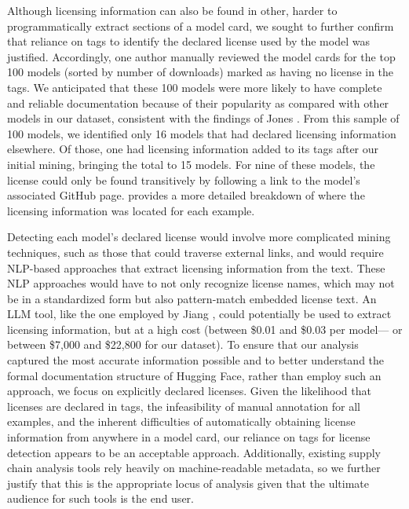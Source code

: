Although licensing information can also be found in other, harder to programmatically extract %
sections of a model card, we sought to further confirm that reliance on tags to identify the declared license used by the model %
was justified. Accordingly, one author manually reviewed the model cards for the top 100 models (sorted by number of downloads) marked as having no license in the tags.  We anticipated that these 100 models were more likely to have complete and reliable documentation because of their popularity as compared with other models in our dataset, consistent with the findings of Jones \etal \cite{Jones2024WhatDW}.  From this sample of 100 models, we identified only 16 models that had declared licensing information elsewhere. Of those, one had licensing information added to its tags after our initial mining, bringing the total to 15 models. For nine of these models, the license could only be found transitively by following a link to the model's associated GitHub page.   provides a more detailed breakdown of where the licensing information was located for each example.%



Detecting each model's declared license %
would involve more complicated mining techniques, such as those that could traverse external links, and would require NLP-based approaches that extract licensing information from the text.  These NLP approaches would have to not only recognize license names, which may not be in a standardized form but also pattern-match embedded license text. An LLM tool, like the one employed by Jiang \etal \cite{jiang2024peatmoss}, could potentially be used to extract licensing information, but at a high cost (between \$0.01 and \$0.03 per model--- or between \$7,000 and \$22,800 for our dataset). To ensure that our analysis captured the most accurate information possible and to better understand the formal documentation structure of Hugging Face, rather than employ such an approach, we focus on explicitly declared licenses.
Given the likelihood that licenses are declared in tags, the infeasibility of manual annotation for all examples, and the inherent difficulties of automatically obtaining license information from anywhere in a model card, our reliance on tags for license detection appears to be an acceptable approach. Additionally, existing supply chain analysis tools rely heavily on machine-readable metadata, so we further justify that this is the appropriate locus of analysis given that the ultimate audience for such tools is the end user. %


